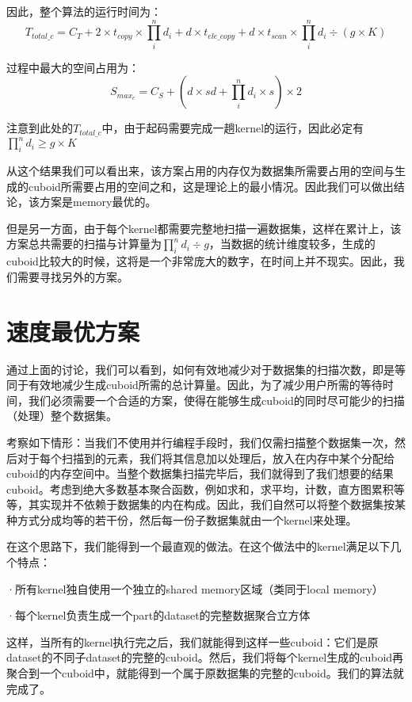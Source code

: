 因此，整个算法的运行时间为：
\begin{equation}
T_{total\_c} = C_T + 2 \times t_{copy} \times \prod_{i}^{n} d_i + d \times t_{ele\_copy} + d \times t_{scan} \times \prod_{i}^{n} d_i \div (g \times K)
\end{equation}

过程中最大的空间占用为：
\begin{equation}
S_{max_c} = C_S + (d \times sd + \prod_{i}^{n} d_i \times s) \times 2
\end{equation}

注意到此处的$T_{total\_c}$中，由于起码需要完成一趟kernel的运行，因此必定有$\prod_{i}^{n} d_i \geq g \times K$

从这个结果我们可以看出来，该方案占用的内存仅为数据集所需要占用的空间与生成的cuboid所需要占用的空间之和，这是理论上的最小情况。因此我们可以做出结论，该方案是memory最优的。

但是另一方面，由于每个kernel都需要完整地扫描一遍数据集，这样在累计上，该方案总共需要的扫描与计算量为$\prod_{i}^{n} d_i \div g$，当数据的统计维度较多，生成的cuboid比较大的时候，这将是一个非常庞大的数字，在时间上并不现实。因此，我们需要寻找另外的方案。

\section{速度最优方案}
通过上面的讨论，我们可以看到，如何有效地减少对于数据集的扫描次数，即是等同于有效地减少生成cuboid所需的总计算量。因此，为了减少用户所需的等待时间，我们必须需要一个合适的方案，使得在能够生成cuboid的同时尽可能少的扫描（处理）整个数据集。

考察如下情形：当我们不使用并行编程手段时，我们仅需扫描整个数据集一次，然后对于每个扫描到的元素，我们将其信息加以处理后，放入在内存中某个分配给cuboid的内存空间中。当整个数据集扫描完毕后，我们就得到了我们想要的结果cuboid。考虑到绝大多数基本聚合函数，例如求和，求平均，计数，直方图累积等等，其实现并不依赖于数据集的内在构成。因此，我们自然可以将整个数据集按某种方式分成均等的若干份，然后每一份子数据集就由一个kernel来处理。

在这个思路下，我们能得到一个最直观的做法。在这个做法中的kernel满足以下几个特点：

{\quad}·所有kernel独自使用一个独立的shared memory区域（类同于local memory）

{\quad}·每个kernel负责生成一个part的dataset的完整数据聚合立方体

这样，当所有的kernel执行完之后，我们就能得到这样一些cuboid：它们是原dataset的不同子dataset的完整的cuboid。然后，我们将每个kernel生成的cuboid再聚合到一个cuboid中，就能得到一个属于原数据集的完整的cuboid。我们的算法就完成了。

